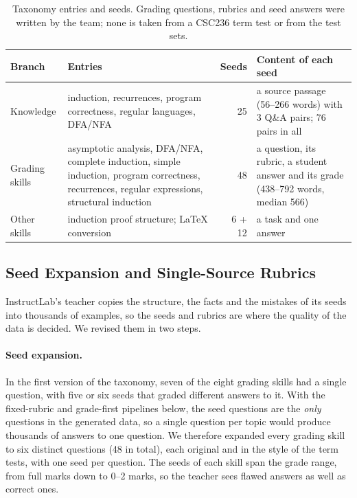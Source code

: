 \documentclass[11pt,a4paper]{article}
\theoremstyle{definition}
\begin{document}
\begin{table}[t]
\centering
\caption{Taxonomy entries and seeds. Grading questions, rubrics and seed answers were written by the team; none is taken from a CSC236 term test or from the test sets.}
\label{tab:taxonomy}
\small
\begin{tabularx}{\linewidth}{l>{\raggedright\arraybackslash}Xr>{\raggedright\arraybackslash}p{3.6cm}}
\toprule
Branch & Entries & Seeds & Content of each seed\\
\midrule
Knowledge & induction, recurrences, program correctness, regular languages, DFA/NFA & 25 & a source passage (56--266 words) with 3 Q\&A pairs; 76 pairs in all\\
Grading skills & asymptotic analysis, DFA/NFA, complete induction, simple induction, program correctness, recurrences, regular expressions, structural induction & 48 & a question, its rubric, a student answer and its grade (438--792 words, median 566)\\
Other skills & induction proof structure; \LaTeX{} conversion & 6 + 12 & a task and one answer\\
\bottomrule
\end{tabularx}
\end{table}

\subsection{Seed Expansion and Single-Source Rubrics}\label{sec:seeds}
InstructLab's teacher copies the structure, the facts and the mistakes of its seeds into thousands of examples, so the seeds and rubrics are where the quality of the data is decided. We revised them in two steps.

\paragraph{Seed expansion.}
In the first version of the taxonomy, seven of the eight grading skills had a single question, with five or six seeds that graded different answers to it. With the fixed-rubric and grade-first pipelines below, the seed questions are the \emph{only} questions in the generated data, so a single question per topic would produce thousands of answers to one question. We therefore expanded every grading skill to six distinct questions (48 in total), each original and in the style of the term tests, with one seed per question. The seeds of each skill span the grade range, from full marks down to 0--2 marks, so the teacher sees flawed answers as well as correct ones.
\end{document}
